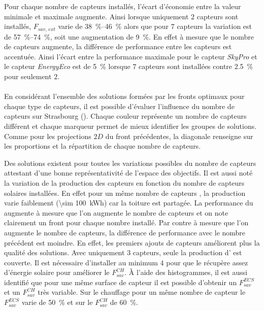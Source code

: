 Pour chaque nombre de capteurs installés, l’écart d’économie entre la valeur minimale et
maximale augmente. Ainsi lorsque uniquement $2$ capteurs sont installés, $F_{sav,\, ext}$
varie de \SIrange{38}{46}{\percent} alors que pour $7$ capteurs la variation est de
\SIrange{57}{74}{\percent}, soit une augmentation de \SI{9}{\percent}. En effet à mesure
que le nombre de capteurs augmente, la différence de performance entre les capteurs est
accentuée. Ainsi l’écart entre la performance maximale pour le capteur \textit{SkyPro} et
le capteur \textit{EnergyEco} est de \SI{5}{\percent} lorsque $7$ capteurs sont installées
contre \SI{2.5}{\percent} pour seulement $2$.


\paragraph{} %
En considérant l’ensemble des solutions formées par les fronts optimaux pour chaque
type de capteurs, il est possible d’évaluer l’influence du nombre de capteurs
sur Strasbourg (). Chaque couleur représente un
nombre de capteurs différent et chaque marqueur permet de mieux identifier les
groupes de solutions. Comme pour les projections $2D$ du front précédentes, la diagonale
renseigne sur les proportions et la répartition de chaque nombre de capteurs.

Des solutions existent pour toutes les variations possibles du nombre de capteurs
attestant d’une bonne représentativité de l’espace des objectifs. Il est aussi noté la
variation de la production des capteurs  en fonction du nombre de capteurs
solaires installées. En effet pour un même nombre de capteurs , la production
varie faiblement (\SI{\sim 100}{kWh}) car la toiture est partagée. La performance du
 augmente à mesure que l’on augmente le nombre de capteurs et on note clairement
un front pour chaque nombre installé. Par contre à mesure que l’on augmente le nombre de
capteurs, la différence de performance avec le nombre précédent est moindre. En effet, les
premiers ajouts de capteurs améliorent plus la qualité des solutions. Avec uniquement $3$
capteurs, seule la production d’ est couverte. Il est nécessaire d’installer au
minimum $4$ pour que le  récupère assez d’énergie solaire pour améliorer le
$F_{sav}^{CH}$. À l’aide des histogrammes, il est aussi identifié que pour une même
surface de capteur il est possible d’obtenir un $F_{sav}^{ECS}$ et un $F_{sav}^{CH}$ très
variable. Sur le chauffage pour un même nombre de capteur le $F_{sav}^{ECS}$ varie de
\SI{50}{\percent} et sur le $F_{sav}^{CH}$ de \SI{60}{\percent}.

